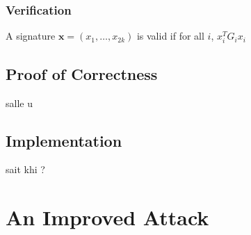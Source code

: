 \documentclass[12pt, a4paper]{article}
\begin{document}
	\subsubsection{Verification}
	
	A signature $\mathbf{x} = (x_1,\dots,x_{2k})$ is valid if for all $i$, $x_i^TG_ix_i$ 
	
	\subsection{Proof of Correctness}
	
	salle u
	
	\subsection{Implementation}
	
	sait khi ?
	
	\section{An Improved Attack}
	
	\subsection{}
		
\end{document}
